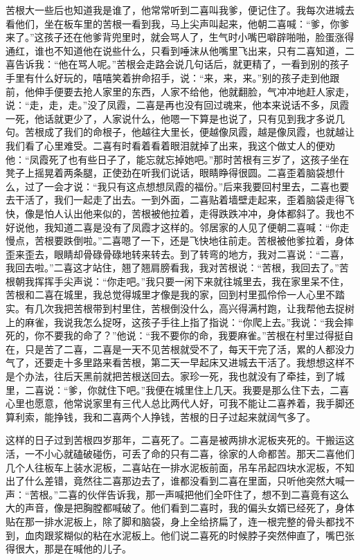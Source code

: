\documentclass[12pt,UTF8]{ctexbook}
\begin{document}
苦根大一些后也知道我是谁了，他常常听到二喜叫我爹，便记住了。我每次进城去看他们，坐在板车里的苦根一看到我，马上尖声叫起来，他朝二喜喊：“爹，你爹来了。”这孩子还在他爹背兜里时，就会骂人了，生气时小嘴巴噼辟啪啪，脸蛋涨得通红，谁也不知道他在说些什么，只看到唾沫从他嘴里飞出来，只有二喜知道，二喜告诉我：“他在骂人呢。”苦根会走路会说几句话后，就更精了，一看到别的孩子手里有什么好玩的，嘻嘻笑着拚命招手，说：“来，来，来。”别的孩子走到他跟前，他伸手便要去抢人家里的东西，人家不给他，他就翻脸，气冲冲地赶人家走，说：“走，走，走。”没了凤霞，二喜是再也没有回过魂来，他本来说话不多，凤霞一死，他话就更少了，人家说什么，他嗯一下算是也说了，只有见到我才多说几句。苦根成了我们的命根子，他越往大里长，便越像凤霞，越是像凤霞，也就越让我们看了心里难受。二喜有时看着看着眼泪就掉了出来，我这个做丈人的便劝他：“凤霞死了也有些日子了，能忘就忘掉她吧。”那时苦根有三岁了，这孩子坐在凳子上摇晃着两条腿，正使劲在听我们说话，眼睛睁得很圆。二喜歪着脑袋想什么，过了一会才说：“我只有这点想想凤霞的福份。”后来我要回村里去，二喜也要去干活了，我们一起走了出去。一到外面，二喜贴着墙壁走起来，歪着脑袋走得飞快，像是怕人认出他来似的，苦根被他拉着，走得跌跌冲冲，身体都斜了。我也不好说他，我知道二喜是没有了凤霞才这样的。邻居家的人见了便朝二喜喊：“你走慢点，苦根要跌倒啦。”二喜嗯了一下，还是飞快地往前走。苦根被他爹拉着，身体歪来歪去，眼睛却骨碌骨碌地转来转去。到了转弯的地方，我对二喜说：“二喜，我回去啦。”二喜这才站住，翘了翘肩膀看我，我对苦根说：“苦根，我回去了。”苦根朝我挥挥手尖声说：“你走吧。”我只要一闲下来就往城里去，我在家里呆不住，苦根和二喜在城里，我总觉得城里才像是我的家，回到村里孤伶伶一人心里不踏实。有几次我把苦根带到村里住，苦根倒没什么，高兴得满村跑，让我帮他去捉树上的麻雀，我说我怎么捉呀，这孩子手往上指了指说：“你爬上去。”我说：“我会摔死的，你不要我的命了？”他说：“我不要你的命，我要麻雀。”苦根在村里过得挺自在，只是苦了二喜，二喜是一天不见苦根就受不了，每天干完了活，累的人都没力气了，还要走十多里路来看苦根，第二天一早起床又进城去干活了。我想想这样不是个办法，往后天黑前就把苦根送回去。家珍一死，我也就没有了牵挂，到了城里，二喜说：“爹，你就住下吧。”我便在城里住上几天。我要是那么住下去，二喜心里也愿意，他常说家里有三代人总比两代人好，可我不能让二喜养着，我手脚还算利索，能挣钱，我和二喜两个人挣钱，苦根的日子过起来就阔气多了。

这样的日子过到苦根四岁那年，二喜死了。二喜是被两排水泥板夹死的。干搬运这活，一不小心就磕破碰伤，可丢了命的只有二喜，徐家的人命都苦。那天二喜他们几个人往板车上装水泥板，二喜站在一排水泥板前面，吊车吊起四块水泥板，不知出了什么差错，竟然往二喜那边去了，谁都没看到二喜在里面，只听他突然大喊一声：“苦根。”二喜的伙伴告诉我，那一声喊把他们全吓住了，想不到二喜竟有这么大的声音，像是把胸膛都喊破了。他们看到二喜时，我的偏头女婿已经死了，身体贴在那一排水泥板上，除了脚和脑袋，身上全给挤扁了，连一根完整的骨头都找不到，血肉跟浆糊似的粘在水泥板上。他们说二喜死的时候脖子突然伸直了，嘴巴张得很大，那是在喊他的儿子。
\end{document}
